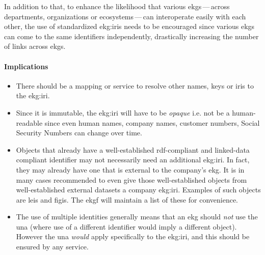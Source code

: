 In addition to that, to enhance the likelihood that various \glspl{ekg}\,---\,across departments, organizations or
ecosystems\,---\,can interoperate easily with each other, the use of standardized \glspl{ekg:iri} needs to be
encouraged since various \glspl{ekg} can come to the same identifiers independently, drastically increasing the
number of links across \glspl{ekg}.

\paragraph{Implications}

\begin{itemize}
    \item There should be a mapping or service to resolve other names, keys or \glspl{iri} to the \gls{ekg:iri}.
    \item Since it is immutable, the \gls{ekg:iri} will have to be \textit{opaque} i.e. not be a human-readable
          since even human names, company names, customer numbers, Social Security Numbers can change over time.
    \item Objects that already have a well-established \gls{rdf}-compliant and \gls{linked-data} compliant identifier
          may not necessarily need an additional \gls{ekg:iri}.
          In fact, they may already have one that is external to the company's \gls{ekg}.
          It is in many cases recommended to even give those well-established objects from well-established external
          datasets a company \gls{ekg:iri}. Examples of such objects are \glspl{lei} and \glspl{figi}.
          The \gls{ekgf} will maintain a list of these for convenience.
    \item The use of multiple identities generally means that an \gls{ekg} should \textit{not}
          use the \gls{una} (where use of a different identifier would imply a different object).
          However the \gls{una} \textit{would} apply specifically to the \gls{ekg:iri},
          and this should be ensured by any service.
\end{itemize}
  
